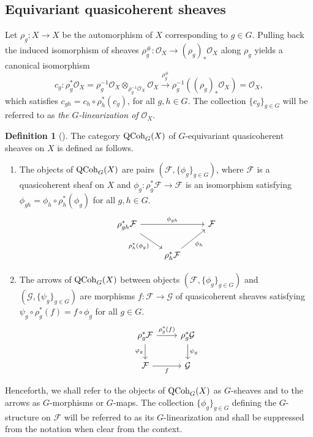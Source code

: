 \documentclass[10pt]{amsart}
\theoremstyle{definition}
\newtheorem{definition}[theorem]{Definition}
\begin{document}
\subsection{Equivariant quasicoherent sheaves}
Let $\rho_g:X\rightarrow X$ be the automorphism of $X$ corresponding to $g\in G$. Pulling back the induced isomorphism of sheaves $\rho^\#_g:\mathcal{O}_X\rightarrow (\rho_g)_*\mathcal{O}_X$ along $\rho_g$ yields a canonical isomorphism 
\[
c_g:\rho^*_g\mathcal{O}_X=\rho_g^{-1}\mathcal{O}_X\otimes_{\rho_g^{-1}\mathcal{O}_X} \mathcal{O}_X\overset{\rho^\#_g}{\longrightarrow}\rho_g^{-1}((\rho_g)_*\mathcal{O}_X)=\mathcal{O}_X,
\] 
which satisfies $c_{gh}=c_h\circ\rho^*_h(c_g)$, for all $g,h\in G$. The collection $\{c_g\}_{g\in G}$ will be referred to as {\em the $G$-linearization of $\mathcal{O}_X$}.

\begin{definition}[{\cite[\S 3.1.6]{MR1304906}}]\label{def:G-sheaf}
The category ${\rm QCoh}_G(X)$ of $G$-equivariant quasicoherent sheaves on $X$ is defined as follows.

\begin{enumerate}
\item The objects of ${\rm QCoh}_G(X)$ are pairs $(\mathcal{F},\{\phi_g\}_{g\in G})$, where $\mathcal{F}$ is a quasicoherent sheaf on $X$ and  $\phi_g:\rho^*_g\mathcal{F}\rightarrow\mathcal{F}$ is an isomorphism satisfying $\phi_{gh}=\phi_h\circ\rho^*_h(\phi_g)$ for all $g,h\in G$.
\[
\begin{tikzcd}
\rho_{gh}^*\mathcal F \arrow[rr, "\phi_{gh}"] \arrow[dr,"\rho_h^*(\phi_g)"'] & & 
\mathcal F  \\
& \rho_h^*\mathcal F \arrow[ur,"\phi_h"'] & 
\end{tikzcd}
\]
\item The arrows of ${\rm QCoh}_G(X)$ between objects $(\mathcal{F},\{\phi_g\}_{g\in G})$ and $(\mathcal{G},\{\psi_g\}_{g\in G})$ are morphisms $f:\mathcal{F}\rightarrow\mathcal{G}$ of quasicoherent sheaves satisfying $\psi_g\circ \rho^*_g(f) =f\circ\phi_g$ for all $g\in G$. 
\[
\begin{tikzcd}
\rho_g^*\mathcal F \arrow[r,"\rho_g^*(f)"] \arrow[d,"\varphi_g"'] & \rho_g^*\mathcal G \arrow[d,"\psi_g"] \\
\mathcal F \arrow[r,"f"'] & \mathcal G
\end{tikzcd}
\]
\end{enumerate}
\end{definition}

Henceforth, we shall refer to the objects of ${\rm QCoh}_G(X)$ as $G$-sheaves and to the arrows as $G$-morphisms or $G$-maps. The collection $\{\phi_g\}_{g\in G}$ defining the $G$-structure on $\mathcal{F}$ will be referred to as its $G$-linearization and shall be suppressed from the notation when clear from the context.
\end{document}
